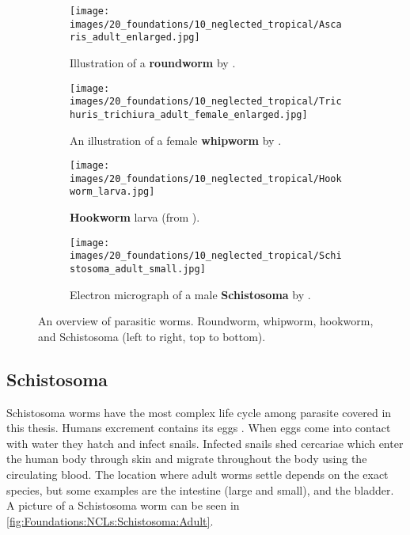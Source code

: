 \begin{figure}
    \begin{subfigure}[t]{0.45\textwidth}
        \centering
        \texttt{[image: images/20\_foundations/10\_neglected\_tropical/Ascaris\_adult\_enlarged.jpg]}
        \caption{Illustration of a \textbf{roundworm} by \textcite{blainville1824traite}.}
        \label{fig:Foundations:NCLs:STHs:Ascaris}
        \vspace*{2mm}
    \end{subfigure}
    \hfill
    \begin{subfigure}[t]{0.45\textwidth}
        \centering
        \texttt{[image: images/20\_foundations/10\_neglected\_tropical/Trichuris\_trichiura\_adult\_female\_enlarged.jpg]}
        \caption{An illustration of a female \textbf{whipworm} by \textcite{blainville1824traite}.}
        \label{fig:Foundations:NCLs:STHs:Whipworm:Adult}
        \vspace*{2mm}
    \end{subfigure}
    \begin{subfigure}[t]{0.45\textwidth}
        \centering
        \texttt{[image: images/20\_foundations/10\_neglected\_tropical/Hookworm\_larva.jpg]}
        \caption{\textbf{Hookworm} larva (from \textcite{dpdx2019hookworm}).}
        \label{fig:Foundations:NCLs:STHs:Hookworm:Adult}
    \end{subfigure}    
    \hfill
    \begin{subfigure}[t]{0.45\textwidth}
        \centering
        \texttt{[image: images/20\_foundations/10\_neglected\_tropical/Schistosoma\_adult\_small.jpg]}
        \caption{Electron micrograph of a male \textbf{Schistosoma} by \textcite{davidwilliams2009schistosoma}.}
        \label{fig:Foundations:NCLs:Schistosoma:Adult}
    \end{subfigure}
    \caption{An overview of parasitic worms. Roundworm, whipworm, hookworm, and Schistosoma (left to right, top to bottom).}
    \label{fig:Foundations:NCLs:Overview}
\end{figure}


\subsection{Schistosoma}
\label{sec:Foundations:NTDs:STHs:Schistosoma}

Schistosoma worms have the most complex life cycle among parasite covered in this thesis. Humans excrement contains its eggs \cite{nelwan2019schistosomiasis}. When eggs come into contact with water they hatch and infect snails. Infected snails shed cercariae which enter the human body through skin and migrate throughout the body using the circulating blood. The location where adult worms settle depends on the exact species, but some examples are the intestine (large and small), and the bladder. A picture of a Schistosoma worm can be seen in \autoref{fig:Foundations:NCLs:Schistosoma:Adult}.

